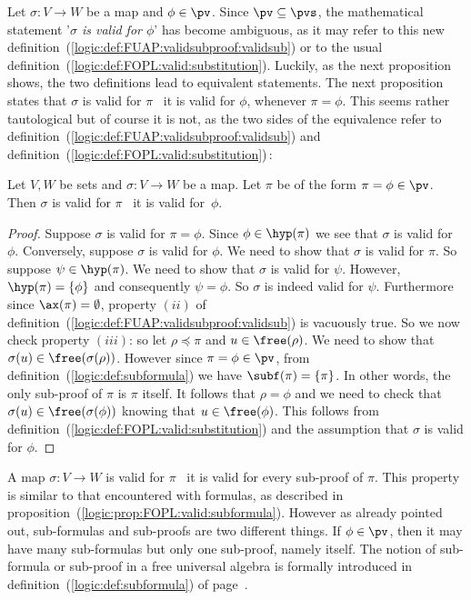 Let $\sigma:V\to W$ be a map and $\phi\in\pv$. Since
$\pv\subseteq\pvs$, the mathematical statement '{\em $\sigma$ is
valid for $\phi$}' has become ambiguous, as it may refer to this new
definition~(\ref{logic:def:FUAP:validsubproof:validsub}) or to the
usual definition~(\ref{logic:def:FOPL:valid:substitution}). Luckily,
as the next proposition shows, the two definitions lead to
equivalent statements. The next proposition states that $\sigma$ is
valid for $\pi$ \ifand\ it is valid for $\phi$, whenever $\pi=\phi$.
This seems rather tautological but of course it is not, as the two
sides of the equivalence refer to
definition~(\ref{logic:def:FUAP:validsubproof:validsub}) and
definition~(\ref{logic:def:FOPL:valid:substitution})\,:
\begin{prop}\label{logic:prop:FUAP:validsubproof:recursion:formula}
Let $V, W$ be sets and $\sigma:V\to W$ be a map. Let $\pi$ be of the
form $\pi=\phi\in\pv$. Then $\sigma$ is valid for $\pi$ \ifand\ it
is valid for~$\phi$.
\end{prop}
\begin{proof}
Suppose $\sigma$ is valid for $\pi=\phi$. Since $\phi\in\hyp(\pi)$
we see that $\sigma$ is valid for~$\phi$. Conversely, suppose
$\sigma$ is valid for $\phi$. We need to show that $\sigma$ is valid
for $\pi$. So suppose $\psi\in\hyp(\pi)$. We need to show that
$\sigma$ is valid for $\psi$. However, $\hyp(\pi)=\{\phi\}$ and
consequently $\psi=\phi$. So $\sigma$ is indeed valid for $\psi$.
Furthermore since $\ax(\pi)=\emptyset$, property $(ii)$ of
definition~(\ref{logic:def:FUAP:validsubproof:validsub}) is
vacuously true. So we now check property $(iii)$: so let
$\rho\preceq\pi$ and $u\in\free(\rho)$. We need to show that
$\sigma(u)\in\free(\sigma(\rho))$. However since $\pi=\phi\in\pv$,
from definition~(\ref{logic:def:subformula}) we have
$\subf(\pi)=\{\pi\}$. In other words, the only sub-proof of $\pi$ is
$\pi$ itself. It follows that $\rho=\phi$ and we need to check that
$\sigma(u)\in\free(\sigma(\phi))$ knowing that $u\in\free(\phi)$.
This follows from
definition~(\ref{logic:def:FOPL:valid:substitution}) and the
assumption that $\sigma$ is valid for $\phi$.
\end{proof}


A map $\sigma:V\to W$ is valid for $\pi$ \ifand\ it is valid for
every sub-proof of $\pi$. This property is similar to that
encountered with formulas, as described in
proposition~(\ref{logic:prop:FOPL:valid:subformula}). However as
already pointed out, sub-formulas and sub-proofs are two different
things. If $\phi\in\pv$, then it may have many sub-formulas but only
one sub-proof, namely itself. The notion of sub-formula or sub-proof
in a free universal algebra is formally introduced in
definition~(\ref{logic:def:subformula}) of
page~\pageref{logic:def:subformula}.

